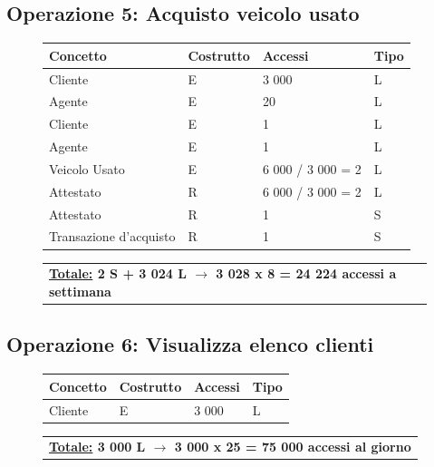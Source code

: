 \documentclass[a4paper,12pt]{report}
\begin{document}
\subsection*{Operazione 5: Acquisto veicolo usato}
\begin{figure}[H]
	\centering
	\begin{tabular}{L{4.5cm}C{2cm}C{4.5cm}C{2cm}}
		\rule[-2mm]{0mm}{0.6cm}{}
		\textbf{Concetto} & \textbf{Costrutto} &\textbf{Accessi} & \textbf{Tipo} \\
		\hline\rule[-2mm]{0mm}{0.65cm}{}
		Cliente & E & 3 000 & L \\
		\hline\rule[-2mm]{0mm}{0.65cm}{}
		Agente & E & 20 & L \\
		\hline\rule[-2mm]{0mm}{0.65cm}{}
		Cliente & E & 1 & L \\
		\hline\rule[-2mm]{0mm}{0.65cm}{}
		Agente & E & 1 & L \\
		\hline\rule[-2mm]{0mm}{0.65cm}{}
		Veicolo Usato & E & 6 000 / 3 000 = 2 & L \\
		\hline\rule[-2mm]{0mm}{0.65cm}{}
		Attestato & R & 6 000 / 3 000 = 2 & L \\
		\hline\rule[-2mm]{0mm}{0.65cm}{}
		Attestato & R & 1 & S \\
		\hline\rule[-2mm]{0mm}{0.65cm}{}
		Transazione d'acquisto& R & 1 & S \\
	\end{tabular}
	
	\begin{tabular}{C{14.4cm}}
		\rule[-3mm]{0mm}{0.85cm}{}	
		 \textbf{\underline{Totale:} 2 S +  3 024 L $\to$ 3 028 x 8 = 24 224 accessi a settimana}
	\end{tabular}
\end{figure}

\subsection*{Operazione 6: Visualizza elenco clienti}
\begin{figure}[H]
	\centering
	\begin{tabular}{L{4.5cm}C{2cm}C{4.5cm}C{2cm}}
		\rule[-2mm]{0mm}{0.6cm}{}
		\textbf{Concetto} & \textbf{Costrutto} &\textbf{Accessi} & \textbf{Tipo} \\
		\hline\rule[-2mm]{0mm}{0.65cm}{}
		Cliente & E & 3 000 & L \\
	\end{tabular}
	
	\begin{tabular}{C{14.3cm}}
		\rule[-3mm]{0mm}{0.85cm}{}	
		 \textbf{\underline{Totale:} 3 000 L $\to$ 3 000 x 25 = 75 000 accessi al giorno}
	\end{tabular}
\end{figure}
\end{document}
